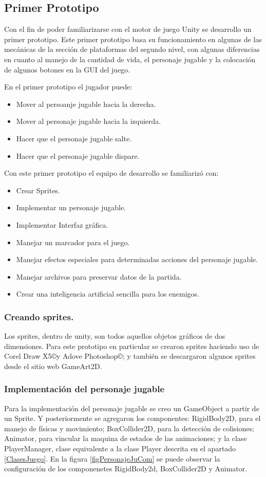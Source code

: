 \subsection{Primer Prototipo}
Con el fin de poder familiarizarse con el motor de juego Unity
se desarrollo un primer prototipo. Este primer prototipo basa su funcionamiento 
en algunas de las mecánicas de la sección de plataformas del segundo nivel, con 
algunas diferencias en cuanto al manejo de la cantidad de vida, el personaje 
jugable y la colocación de algunos botones en la GUI del juego.
\\
\par
En el primer prototipo el jugador puede:
\begin{itemize}
	\item Mover al persoanje jugable hacia la derecha.
	\item Mover al personaje jugable hacia la izquierda.
	\item Hacer que el personaje jugable salte.
	\item Hacer que el personaje jugable dispare.
\end{itemize}

Con este primer prototipo el equipo de desarrollo se familiarizó con:
\begin{itemize}
	\item Crear Sprites.
	\item Implementar un personaje jugable.
	\item Implementar Interfaz gráfica.
	\item Manejar un marcador para el juego.
	\item Manejar efectos especiales para determinadas acciones del personaje jugable.
	\item Manejar archivos para preservar datos de la partida.
	\item Crear una inteligencia artificial sencilla para los enemigos.
\end{itemize}

\subsubsection{Creando sprites.}
Los sprites, dentro de unity, son todos aquellos objetos gráficos de dos 
dimensiones. Para este prototipo en particular se crearon sprites haciendo uso 
de Corel Draw X5\copyright y Adove Photoshop\copyright ; y también se descargaron 
algunos sprites desde el sitio web GameArt2D.  

\subsubsection{Implementación del personaje jugable}
Para la implementación del personaje jugable se creo un GameObject a partir de 
un Sprite. Y posteriormente se agregaron los componentes: RigidBody2D, para el 
manejo de físicas y movimiento; BoxCollider2D, para la detección de colisiones; 
Animator, para vincular la maquina de estados de las animaciones; y la clase PlayerManager, clase equivalente a la clase Player descrita en el apartado 
\ref{ClasesJuego}. En la figura \ref{figPersonajeJuCom} se puede observar la 
configuración de los componenetes RigidBody2d, BoxCollider2D y Animator.

